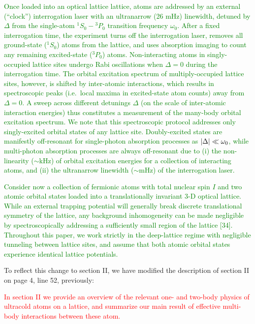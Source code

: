 \documentclass[preprint]{revtex4-1}
\newcommand{\1}{\mathds{1}}
\newcommand{\red}[1]{\textcolor{red}{#1}}
\newcommand{\green}[1]{\textcolor{green}{#1}}
\begin{document}
\begin{enumerate}
  \green{Once loaded into an optical lattice lattice, atoms are
    addressed by an external (``clock'') interrogation laser with an
    ultranarrow (26 mHz) linewidth, detuned by $\Delta$ from the
    single-atom ${}^1S_0-{}^3P_0$ transition frequency $\omega_0$.
    After a fixed interrogation time, the experiment turns off the
    interrogation laser, removes all ground-state (${}^1S_0$) atoms
    from the lattice, and uses absorption imaging to count any
    remaining excited-state (${}^3P_0$) atoms.  Non-interacting atoms
    in singly-occupied lattice sites undergo Rabi oscillations when
    $\Delta=0$ during the interrogation time.  The orbital excitation
    spectrum of multiply-occupied lattice sites, however, is shifted
    by inter-atomic interactions, which results in spectroscopic peaks
    (i.e.~local maxima in excited-state atom counts) away from
    $\Delta=0$.  A sweep across different detunings $\Delta$ (on the
    scale of inter-atomic interaction energies) thus constitutes a
    measurement of the many-body orbital excitation spectrum.  We note
    that this spectroscopic protocol addresses only singly-excited
    orbital states of any lattice site.  Doubly-excited states are
    manifestly off-resonant for single-photon absorption processes as
    $\abs{\Delta}\ll\omega_0$, while multi-photon absorption processes
    are always off-resonant due to (i) the non-linearity ($\sim$kHz)
    of orbital excitation energies for a collection of interacting
    atoms, and (ii) the ultranarrow linewidth ($\sim$mHz) of the
    interrogation laser.}

  \green{Consider now a collection of fermionic atoms with total
    nuclear spin $I$ and two atomic orbital states loaded into a
    translationally invariant 3-D optical lattice.  While an external
    trapping potential will generally break discrete translational
    symmetry of the lattice, any background inhomogeneity can be made
    negligible by spectroscopically addressing a sufficiently small
    region of the lattice [34].  Throughout this paper, we work
    strictly in the deep-lattice regime with negligible tunneling
    between lattice sites, and assume that both atomic orbital states
    experience identical lattice potentials.}

  To reflect this change to section II, we have modified the
  description of section II on page 4, line 52, previously:

  \red{In section II we provide an overview of the relevant one- and
    two-body physics of ultracold atoms on a lattice, and summarize
    our main result of effective multi-body interactions between these
    atom.}


\end{enumerate}
\end{document}
